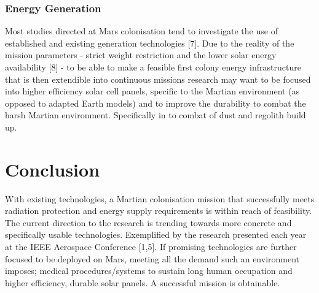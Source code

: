 \documentclass[12pt]{article}
\begin{document}
\subsubsection*{Energy Generation}
Most studies directed at Mars colonisation tend to investigate the use of established and existing generation technologies [7]. Due to the reality of the mission parameters - strict weight restriction and the lower solar energy availability [8] - to be able to make a feasible first colony energy infrastructure that is then extendible into continuous missions research may want to be focused into higher efficiency solar cell panels, specific to the Martian environment (as opposed to adapted Earth models) and to improve the durability to combat the harsh Martian environment. Specifically in to combat of dust and regolith build up.
\section{Conclusion}
With existing technologies, a Martian colonisation mission that successfully meets radiation protection and energy supply requirements is within reach of feasibility. The current direction to the research is trending towards more concrete and specifically usable technologies. Exemplified by the research presented each year at the IEEE Aerospace Conference [1,5]. If promising technologies are further focused to be deployed on Mars, meeting all the demand such an environment imposes; medical procedures/systems to sustain long human occupation and higher efficiency, durable solar panels. A successful mission is obtainable.
\end{document}
